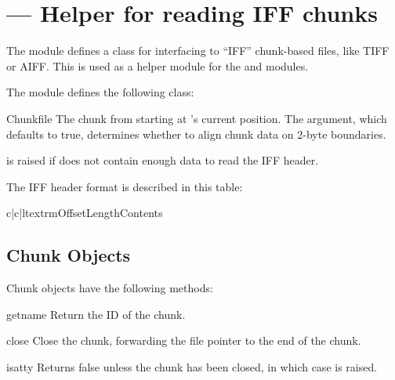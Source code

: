 \section{ ---
         Helper for reading IFF chunks}


The  module defines a class for interfacing to ``IFF''
chunk-based files, like TIFF or AIFF.  This is used as a helper module
for the  and  modules.

The  module defines the following class:

\begin{classdesc}{Chunk}{file}
The chunk from  starting at 's current
position. The  argument, which defaults to true, determines 
whether to align chunk data on 2-byte boundaries.

 is raised if  does not contain enough
data to read the IFF header.
\end{classdesc}

The IFF header format is described in this table:

\begin{tableiii}{c|c|l}{textrm}{Offset}{Length}{Contents}
\end{tableiii}


\subsection{Chunk Objects \label{iff-chunk-objects}}

Chunk objects have the following methods:

\begin{methoddesc}{getname}{}
Return the ID of the chunk.
\end{methoddesc}

\begin{methoddesc}{close}{}
Close the chunk, forwarding the file pointer to the end of the chunk.
\end{methoddesc}

\begin{methoddesc}{isatty}{}
Returns false unless the chunk has been closed, in which case
 is raised.
\end{methoddesc}

